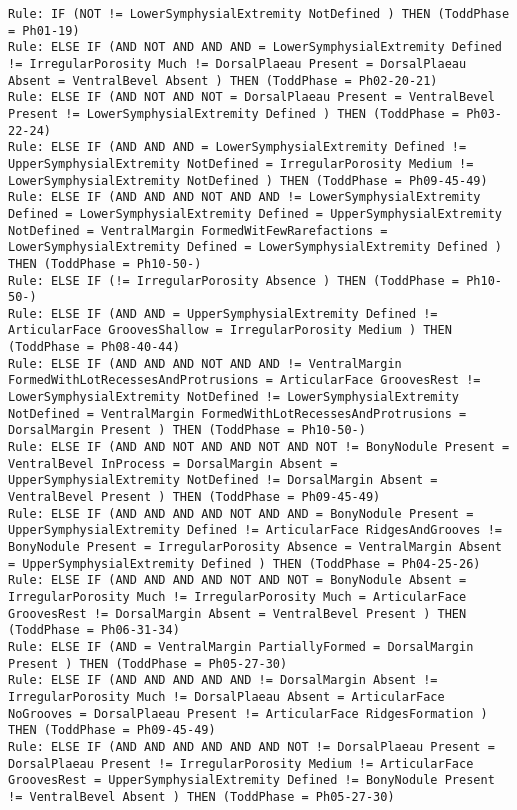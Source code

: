 \begin{lstlisting}
Rule: IF (NOT != LowerSymphysialExtremity NotDefined ) THEN (ToddPhase = Ph01-19)
Rule: ELSE IF (AND NOT AND AND AND = LowerSymphysialExtremity Defined != IrregularPorosity Much != DorsalPlaeau Present = DorsalPlaeau Absent = VentralBevel Absent ) THEN (ToddPhase = Ph02-20-21)
Rule: ELSE IF (AND NOT AND NOT = DorsalPlaeau Present = VentralBevel Present != LowerSymphysialExtremity Defined ) THEN (ToddPhase = Ph03-22-24)
Rule: ELSE IF (AND AND AND = LowerSymphysialExtremity Defined != UpperSymphysialExtremity NotDefined = IrregularPorosity Medium != LowerSymphysialExtremity NotDefined ) THEN (ToddPhase = Ph09-45-49)
Rule: ELSE IF (AND AND AND NOT AND AND != LowerSymphysialExtremity Defined = LowerSymphysialExtremity Defined = UpperSymphysialExtremity NotDefined = VentralMargin FormedWitFewRarefactions = LowerSymphysialExtremity Defined = LowerSymphysialExtremity Defined ) THEN (ToddPhase = Ph10-50-)
Rule: ELSE IF (!= IrregularPorosity Absence ) THEN (ToddPhase = Ph10-50-)
Rule: ELSE IF (AND AND = UpperSymphysialExtremity Defined != ArticularFace GroovesShallow = IrregularPorosity Medium ) THEN (ToddPhase = Ph08-40-44)
Rule: ELSE IF (AND AND AND NOT AND AND != VentralMargin FormedWithLotRecessesAndProtrusions = ArticularFace GroovesRest != LowerSymphysialExtremity NotDefined != LowerSymphysialExtremity NotDefined = VentralMargin FormedWithLotRecessesAndProtrusions = DorsalMargin Present ) THEN (ToddPhase = Ph10-50-)
Rule: ELSE IF (AND AND NOT AND AND NOT AND NOT != BonyNodule Present = VentralBevel InProcess = DorsalMargin Absent = UpperSymphysialExtremity NotDefined != DorsalMargin Absent = VentralBevel Present ) THEN (ToddPhase = Ph09-45-49)
Rule: ELSE IF (AND AND AND AND NOT AND AND = BonyNodule Present = UpperSymphysialExtremity Defined != ArticularFace RidgesAndGrooves != BonyNodule Present = IrregularPorosity Absence = VentralMargin Absent = UpperSymphysialExtremity Defined ) THEN (ToddPhase = Ph04-25-26)
Rule: ELSE IF (AND AND AND AND NOT AND NOT = BonyNodule Absent = IrregularPorosity Much != IrregularPorosity Much = ArticularFace GroovesRest != DorsalMargin Absent = VentralBevel Present ) THEN (ToddPhase = Ph06-31-34)
Rule: ELSE IF (AND = VentralMargin PartiallyFormed = DorsalMargin Present ) THEN (ToddPhase = Ph05-27-30)
Rule: ELSE IF (AND AND AND AND AND != DorsalMargin Absent != IrregularPorosity Much != DorsalPlaeau Absent = ArticularFace NoGrooves = DorsalPlaeau Present != ArticularFace RidgesFormation ) THEN (ToddPhase = Ph09-45-49)
Rule: ELSE IF (AND AND AND AND AND AND NOT != DorsalPlaeau Present = DorsalPlaeau Present != IrregularPorosity Medium != ArticularFace GroovesRest = UpperSymphysialExtremity Defined != BonyNodule Present != VentralBevel Absent ) THEN (ToddPhase = Ph05-27-30)

\end{lstlisting}
